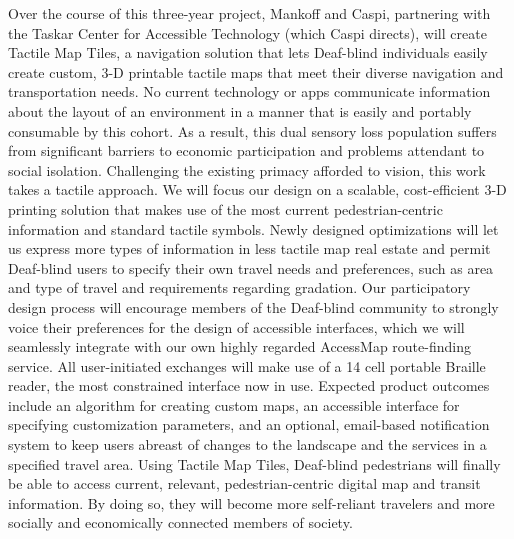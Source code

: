 Over the course of this three-year project, Mankoff and Caspi, partnering with the Taskar Center for Accessible Technology (which Caspi directs), will create Tactile Map Tiles, a navigation solution that lets Deaf-blind individuals easily create custom, 3-D printable tactile maps that meet their diverse navigation and transportation needs. No current technology or apps communicate information about the layout of an environment in a manner that is easily and portably consumable by this cohort. As a result, this dual sensory loss population suffers from significant barriers to economic participation and problems attendant to social isolation.
Challenging the existing primacy afforded to vision, this work takes a tactile approach. We will focus our design on a scalable, cost-efficient 3-D printing solution that makes use of the most current pedestrian-centric information and standard tactile symbols. Newly designed optimizations will let us express more types of information in less tactile map real estate and permit Deaf-blind users to specify their own travel needs and preferences, such as area and type of travel and requirements regarding gradation. Our participatory design process will encourage members of the Deaf-blind community to strongly voice their preferences for the design of accessible interfaces, which we will seamlessly integrate with our own highly regarded AccessMap route-finding service. All user-initiated exchanges will make use of a 14 cell portable Braille reader, the most constrained interface now in use.
Expected product outcomes include an algorithm for creating custom maps, an accessible interface for specifying customization parameters, and an optional, email-based notification system to keep users abreast of changes to the landscape and the services in a specified travel area. Using Tactile Map Tiles, Deaf-blind pedestrians will finally be able to access current, relevant, pedestrian-centric digital map and transit information. By doing so, they will become more self-reliant travelers and more socially and economically connected members of society.


